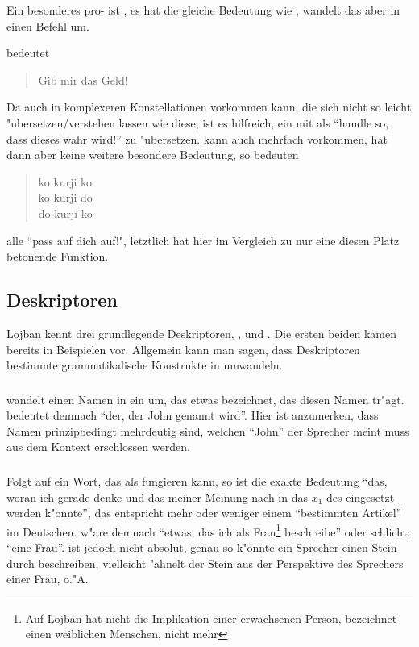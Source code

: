 Ein besonderes pro- ist , es hat die gleiche Bedeutung wie , wandelt das  aber in einen Befehl um.
\begin{quote}
\end{quote}
bedeutet
\begin{quote}
Gib mir das Geld!
\end{quote}
Da  auch in komplexeren Konstellationen vorkommen kann, die sich nicht so leicht "ubersetzen/verstehen lassen wie diese, ist es hilfreich, ein  mit  als ``handle so, dass dieses  wahr wird!'' zu "ubersetzen.
 kann auch mehrfach vorkommen, hat dann aber keine weitere besondere Bedeutung, so bedeuten
\begin{quote}
ko kurji ko \\
ko kurji do \\
do kurji ko
\end{quote}
alle ``pass auf dich auf!", letztlich hat hier  im Vergleich zu  nur eine diesen Platz betonende Funktion.

\subsection{Deskriptoren}
Lojban kennt drei grundlegende Deskriptoren, ,  und . Die ersten beiden kamen bereits in Beispielen vor.
Allgemein kann man sagen, dass Deskriptoren bestimmte grammatikalische Konstrukte in  umwandeln.

\subsubsection{}
 wandelt einen Namen in ein  um, das etwas bezeichnet, das diesen Namen tr"agt.  bedeutet demnach ``der,
der John genannt wird''. Hier ist anzumerken, dass Namen prinzipbedingt mehrdeutig sind, welchen ``John'' der Sprecher meint muss aus dem Kontext
erschlossen werden.

\subsubsection{}
Folgt auf  ein Wort, das als  fungieren kann, so ist die exakte Bedeutung ``das, woran ich gerade denke und das meiner
Meinung nach in das $x_1$ des  eingesetzt werden k"onnte'', das
entspricht mehr oder weniger einem ``bestimmten Artikel'' im Deutschen.
 w"are demnach ``etwas, das ich als Frau\footnote{Auf Lojban hat  nicht die Implikation einer erwachsenen Person,
 bezeichnet einen weiblichen Menschen, nicht mehr} beschreibe'' oder schlicht: ``eine Frau''.  ist jedoch nicht absolut,
genau so k"onnte ein Sprecher einen Stein durch  beschreiben, vielleicht "ahnelt der Stein aus der Perspektive des Sprechers einer
Frau, o."A.

